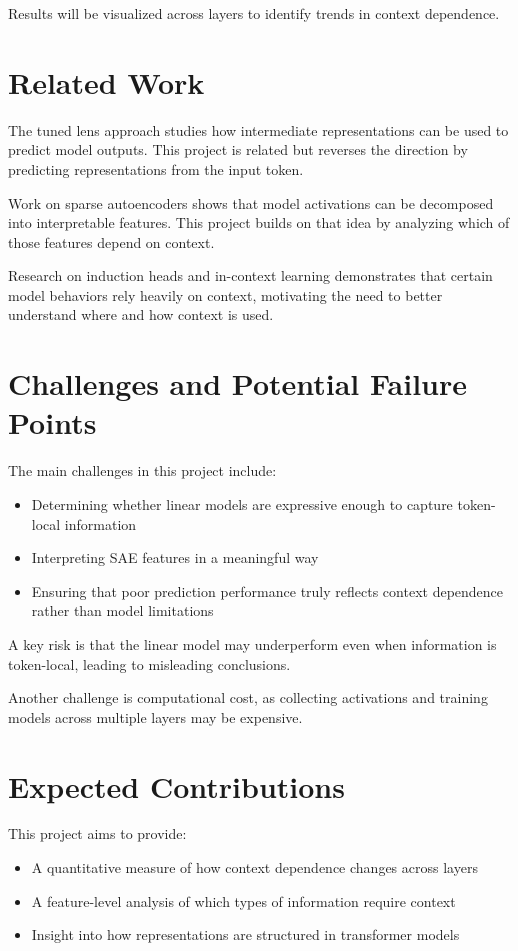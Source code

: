 \documentclass{article}
\begin{document}
Results will be visualized across layers to identify trends in context dependence.

\section{Related Work}

The tuned lens approach \cite{belrose2023tunedlens} studies how intermediate representations can be used to predict model outputs. This project is related but reverses the direction by predicting representations from the input token.

Work on sparse autoencoders \cite{bricken2023monosemanticity} shows that model activations can be decomposed into interpretable features. This project builds on that idea by analyzing which of those features depend on context.

Research on induction heads and in-context learning \cite{olsson2022induction} demonstrates that certain model behaviors rely heavily on context, motivating the need to better understand where and how context is used.

\section{Challenges and Potential Failure Points}

The main challenges in this project include:
\begin{itemize}
    \item Determining whether linear models are expressive enough to capture token-local information
    \item Interpreting SAE features in a meaningful way
    \item Ensuring that poor prediction performance truly reflects context dependence rather than model limitations
\end{itemize}

A key risk is that the linear model may underperform even when information is token-local, leading to misleading conclusions.

Another challenge is computational cost, as collecting activations and training models across multiple layers may be expensive.

\section{Expected Contributions}

This project aims to provide:
\begin{itemize}
    \item A quantitative measure of how context dependence changes across layers
    \item A feature-level analysis of which types of information require context
    \item Insight into how representations are structured in transformer models
\end{itemize}
\end{document}
